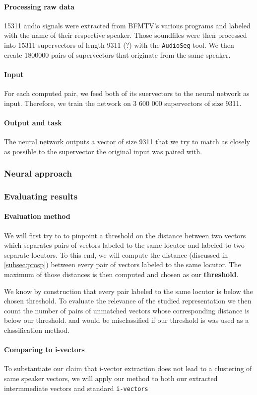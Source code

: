 \documentclass[conference]{IEEEtran}
\begin{document}
\paragraph{Processing raw data}

15311 audio signals were extracted from BFMTV's various programs and labeled
with the name of their respective speaker. Those soundfiles were then processed
into 15311 supervectors of length 9311 (?) with the \texttt{AudioSeg} tool.
We then create 1800000 pairs of supervectors that originate from the same
speaker.

\paragraph{Input}

For each computed pair, we feed both of its suervectors to the neural network as
input. Therefore, we train the network on 3 600 000 supervectors of size 9311.

\paragraph{Output and task}

The neural network outputs a vector of size 9311 that we try to match as closely
as possible to the supervector the original input was paired with.

\subsubsection{Neural approach}

\subsubsection{Evaluating results}

\paragraph{Evaluation method}

We will first try to to pinpoint a threshold on the distance
between two vectors which separates pairs of vectors labeled to the same locutor
and labeled to two separate locutors. To this end, we will compute the distance
(discussed in \ref{subsec:prosp}) between every pair of vectors labeled to the
same locutor. The maximum of those distances is then computed and chosen as our
\textbf{threshold}.

We know by construction that every pair labeled to the same locutor is below the
chosen threshold. To evaluate the relevance of the studied representation we
then count the number of pairs of unmatched vectors whose corresponding distance
is below our threshold. and would be misclassified if our threshold is was used
as a classification method.

\paragraph{Comparing to i-vectors}

 To substantiate our claim that i-vector extraction does not lead to a
 clustering of same speaker vectors, we will apply our method to both our
 extracted intermmediate vectors and standard \texttt{i-vectors}






\appendix

\printbibliography
\end{document}
